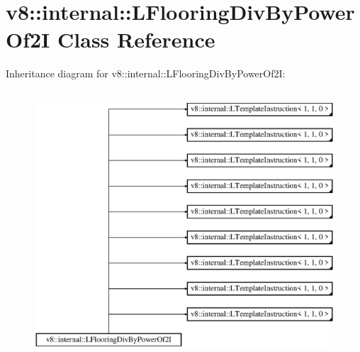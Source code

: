 \hypertarget{classv8_1_1internal_1_1_l_flooring_div_by_power_of2_i}{}\section{v8\+:\+:internal\+:\+:L\+Flooring\+Div\+By\+Power\+Of2I Class Reference}
\label{classv8_1_1internal_1_1_l_flooring_div_by_power_of2_i}
Inheritance diagram for v8\+:\+:internal\+:\+:L\+Flooring\+Div\+By\+Power\+Of2I\+:\begin{figure}[H]
\begin{center}
\leavevmode
\includegraphics[height=10.000000cm]{classv8_1_1internal_1_1_l_flooring_div_by_power_of2_i}
\end{center}
\end{figure}
